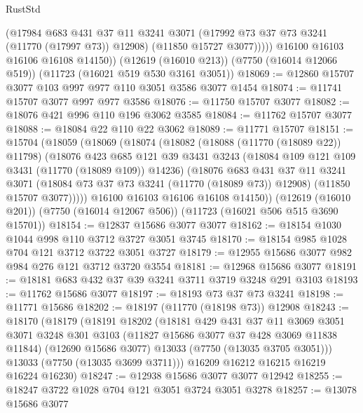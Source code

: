\begin{lexlean}{RustStd}
\begin{coremodule}
              (@17984
                @683
                @431
                @37
                @11
                @3241
                @3071
                (@17992 @73 @37 @73 @3241 (@11770 (@17997 @73)) @12908)
                (@11850 @15727 @3077)))))
        @16100
        @16103
        @16106
        @16108
        @14150))
    (@12619 (@16010 @213))
    (@7750 (@16014 @12066 @519))
    (@11723 (@16021 @519 @530 @3161 @3051))
@18069 := @12860 @15707 @3077 @103 @997 @977 @110 @3051 @3586 @3077 @1454
@18074 := @11741 @15707 @3077 @997 @977 @3586
@18076 := @11750 @15707 @3077
@18082 := @18076 @421 @996 @110 @196 @3062 @3585
@18084 := @11762 @15707 @3077
@18088 := @18084 @22 @110 @22 @3062
@18089 := @11771 @15707
@18151 := @15704
    (@18059
      (@18069
        (@18074
          (@18082
            (@18088 (@11770 (@18089 @22)) @11798)
            (@18076
              @423
              @685
              @121
              @39
              @3431
              @3243
              (@18084 @109 @121 @109 @3431 (@11770 (@18089 @109)) @14236)
              (@18076
                @683
                @431
                @37
                @11
                @3241
                @3071
                (@18084 @73 @37 @73 @3241 (@11770 (@18089 @73)) @12908)
                (@11850 @15707 @3077)))))
        @16100
        @16103
        @16106
        @16108
        @14150))
    (@12619 (@16010 @201))
    (@7750 (@16014 @12067 @506))
    (@11723 (@16021 @506 @515 @3690 @15701))
@18154 := @12837 @15686 @3077 @3077
@18162 := @18154 @1030 @1044 @998 @110 @3712 @3727 @3051 @3745
@18170 := @18154 @985 @1028 @704 @121 @3712 @3722 @3051 @3727
@18179 := @12955 @15686 @3077 @982 @984 @276 @121 @3712 @3720 @3554
@18181 := @12968 @15686 @3077
@18191 := @18181 @683 @432 @37 @39 @3241 @3711 @3719 @3248 @291 @3103
@18193 := @11762 @15686 @3077
@18197 := @18193 @73 @37 @73 @3241
@18198 := @11771 @15686
@18202 := @18197 (@11770 (@18198 @73)) @12908
@18243 := @18170
    (@18179
      (@18191
        @18202
        (@18181
          @429
          @431
          @37
          @11
          @3069
          @3051
          @3071
          @3248
          @301
          @3103
          (@11827 @15686 @3077 @37 @428 @3069 @11838 @11844)
          (@12690 @15686 @3077)
          @13033
          (@7750 (@13035 @3705 @3051)))
        @13033
        (@7750 (@13035 @3699 @3711)))
      @16209
      @16212
      @16215
      @16219
      @16224
      @16230)
@18247 := @12938 @15686 @3077 @3077 @12942
@18255 := @18247 @3722 @1028 @704 @121 @3051 @3724 @3051 @3278
@18257 := @13078 @15686 @3077

\end{coremodule}
\end{lexlean}
